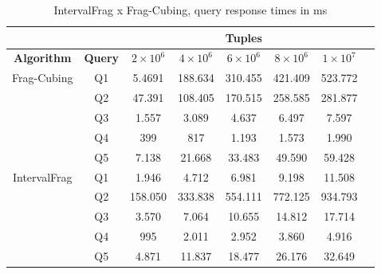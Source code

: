 \begin{table}[!ht]
  \centering
  \caption{IntervalFrag x Frag-Cubing, query response times in ms}\label{tab:interval_query}
  \begin{tabular}{|c|c|c|c|c|c|c|c|}
    \hline
    & & \multicolumn{5}{c|}{\textbf{Tuples}} \\
    \hline
    \bfseries Algorithm & \bfseries Query & \bfseries $2\times10^6$ & \bfseries $4\times10^6$ & \bfseries $6\times10^6$ & \bfseries $8\times10^6$ & \bfseries $1\times10^7$\\
    \hline
    \multirow{5}{*}{Frag-Cubing} & Q1 &
    5.4691 & 188.634 & 310.455 & 421.409 & 523.772
    \\\cline{2-7} & Q2 &
    47.391 & 108.405 & 170.515 & 258.585 & 281.877
    \\\cline{2-7} & Q3 &
    1.557 & 3.089 & 4.637 & 6.497 & 7.597
    \\\cline{2-7} & Q4 &
    399 & 817 & 1.193 & 1.573 & 1.990
    \\\cline{2-7} & Q5 &
    7.138 & 21.668 & 33.483 & 49.590 & 59.428
    \\\hline
    \multirow{5}{*}{IntervalFrag} & Q1 &
    1.946 & 4.712 & 6.981 & 9.198 & 11.508
    \\\cline{2-7}
    & Q2 &
    158.050 & 333.838 & 554.111 & 772.125 & 934.793
    \\\cline{2-7} & Q3 &
    3.570 & 7.064 & 10.655 & 14.812 & 17.714
    \\\cline{2-7}
    & Q4 &
    995 & 2.011 & 2.952 & 3.860 & 4.916
    \\\cline{2-7}
    & Q5 &
    4.871 & 11.837 & 18.477 & 26.176 & 32.649
    \\\hline
  \end{tabular}
\end{table}


